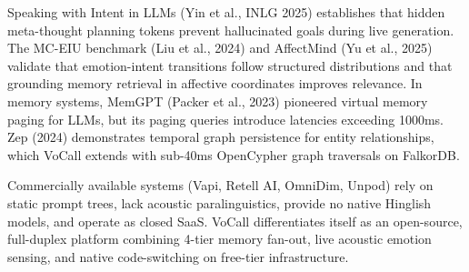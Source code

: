 \documentclass[12pt,a4paper]{article}
\begin{document}
Speaking with Intent in LLMs (Yin et al., INLG 2025) establishes that hidden meta-thought planning tokens prevent hallucinated goals during live generation. The MC-EIU benchmark (Liu et al., 2024) and AffectMind (Yu et al., 2025) validate that emotion-intent transitions follow structured distributions and that grounding memory retrieval in affective coordinates improves relevance. In memory systems, MemGPT (Packer et al., 2023) pioneered virtual memory paging for LLMs, but its paging queries introduce latencies exceeding 1000ms. Zep (2024) demonstrates temporal graph persistence for entity relationships, which VoCall extends with sub-40ms OpenCypher graph traversals on FalkorDB.

Commercially available systems (Vapi, Retell AI, OmniDim, Unpod) rely on static prompt trees, lack acoustic paralinguistics, provide no native Hinglish models, and operate as closed SaaS. VoCall differentiates itself as an open-source, full-duplex platform combining 4-tier memory fan-out, live acoustic emotion sensing, and native code-switching on free-tier infrastructure.

\end{document}
